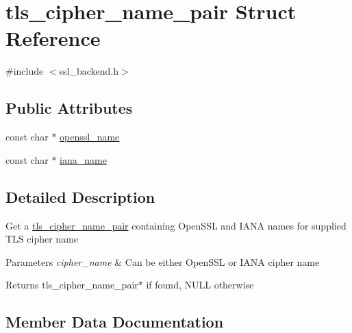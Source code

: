 \hypertarget{structtls__cipher__name__pair}{}\section{tls\+\_\+cipher\+\_\+name\+\_\+pair Struct Reference}
\label{structtls__cipher__name__pair}


{\ttfamily \#include $<$ssl\+\_\+backend.\+h$>$}

\subsection*{Public Attributes}
\begin{DoxyCompactItemize}
\item 
const char $\ast$ \hyperlink{structtls__cipher__name__pair_af5581d7522ab6bde246c07a55b12a82a}{openssl\+\_\+name}
\item 
const char $\ast$ \hyperlink{structtls__cipher__name__pair_a2c888d6795e64bcc1ebf938eceaf4215}{iana\+\_\+name}
\end{DoxyCompactItemize}


\subsection{Detailed Description}
Get a \hyperlink{structtls__cipher__name__pair}{tls\+\_\+cipher\+\_\+name\+\_\+pair} containing Open\+S\+S\+L and I\+A\+N\+A names for supplied T\+L\+S cipher name


\begin{DoxyParams}{Parameters}
{\em cipher\+\_\+name} & Can be either Open\+S\+S\+L or I\+A\+N\+A cipher name \\
\hline
\end{DoxyParams}
\begin{DoxyReturn}{Returns}
tls\+\_\+cipher\+\_\+name\+\_\+pair$\ast$ if found, N\+U\+L\+L otherwise 
\end{DoxyReturn}


\subsection{Member Data Documentation}
\hypertarget{structtls__cipher__name__pair_a2c888d6795e64bcc1ebf938eceaf4215}{}
